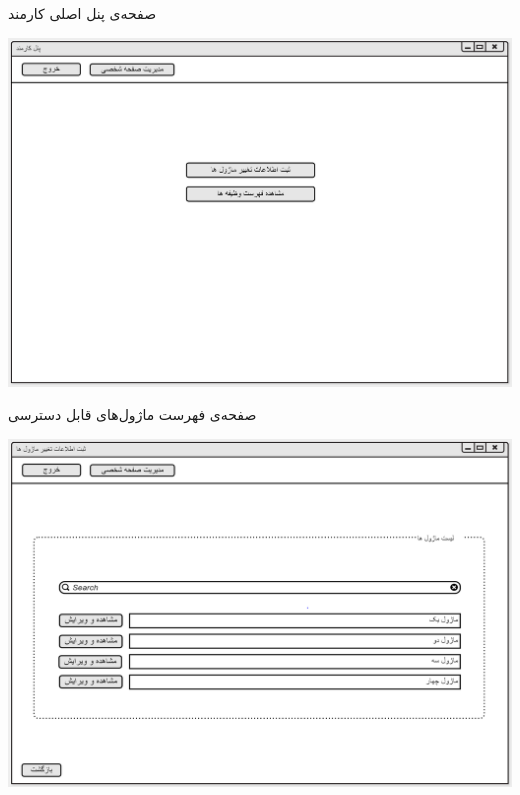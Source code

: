\documentclass{article}
\begin{document}
\vspace{1cm}
صفحه‌ی پنل اصلی کارمند
\begin{center}
\includegraphics[width=\textwidth]{Prototype/Employee/EmployeePanel.png}
\end{center}

\newpage
\vspace{1cm}
صفحه‌ی فهرست ماژول‌های قابل دسترسی
\begin{center}
\includegraphics[width=\textwidth]{Prototype/Employee/ChangeModuleInformation.png}
\end{center}
\end{document}
